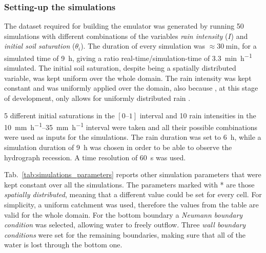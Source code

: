 \subsubsection{Setting-up the simulations}
The dataset required for building the emulator was generated by running \num{50} simulations with different combinations of the variables \emph{rain intensity} ($I$) and \emph{initial soil saturation} ($\theta_i$).
The duration of every simulation was $\approx \SI{30}{\minute}$, for a simulated time of \SI{9}{\hour}, giving a ratio real-time/simulation-time of \SI{3.3}{\minute\per\hour} simulated.
The initial soil saturation, despite being a spatially distributed variable, was kept uniform over the whole domain.
The rain intensity was kept constant and was uniformly applied over the domain, also because , at this stage of development, only allows for uniformly distributed rain \autocite{laguerre_documentation_2016}.

\num{5} different initial saturations in the $[\numrange{0}{1}]$ interval and \num{10} rain intensities in the \SIrange{10}{35}{\milli\metre\per\hour} interval were taken and all their possible combinations were used as inputs for the simulations.
The rain duration was set to \SI{6}{\hour}, while a simulation duration of \SI{9}{\hour} was chosen in order to be able to observe the hydrograph recession. A time resolution of \SI{60}{\second} was used.

Tab.~\ref{tab:simulations_parameters} reports other simulation parameters that were kept constant over all the simulations.
The parameters marked with * are those \emph{spatially distributed}, meaning that a different value could be set for every cell.
For simplicity, a uniform catchment was used, therefore the values from the table are valid for the whole domain.
For the bottom boundary a \textit{Neumann boundary condition} was selected, allowing water to freely outflow.
Three \textit{wall boundary conditions} were set for the remaining boundaries, making sure that all of the water is lost through the bottom one.

